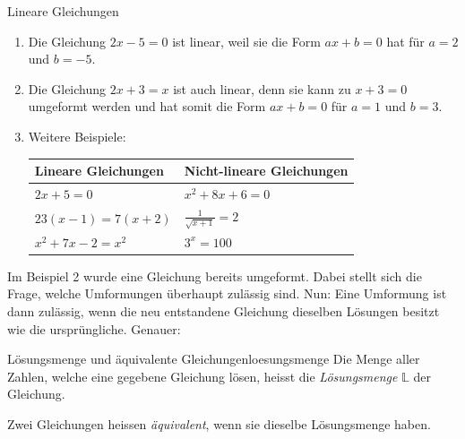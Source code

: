 \begin{bsp}{Lineare Gleichungen}{}
    \begin{enumerate}
        \item Die Gleichung \(2x-5=0\) ist linear, weil sie die Form \(ax+b=0\) hat für \(a=2\) und \(b=-5\).

        \item Die Gleichung \(2x+3=x\) ist auch linear, denn sie kann zu \(x+3=0\) umgeformt werden und hat somit die Form \(ax+b=0\) für \(a=1\) und \(b=3\).

        \item Weitere Beispiele:

              \begin{center}
                  \renewcommand{\arraystretch}{1.8}
                  \begin{tabular}{|>{\centering\arraybackslash}p{}|>{\centering\arraybackslash}p{}|}
                      \hline
                      \textbf{Lineare Gleichungen} & \textbf{Nicht-lineare Gleichungen}      \\
                      \hline
                      \(2x+5=0\)                   & \(x^2+8x+6=0\)                          \\
                      \hline
                      \(23(x-1)=7(x+2)\)           & \(\displaystyle\frac{1}{\sqrt{x+1}}=2\) \\
                      \hline
                      \(x^2+7x-2=x^2\)             & \(3^x=100\)                             \\
                      \hline
                  \end{tabular}
              \end{center}
    \end{enumerate}
\end{bsp}

Im Beispiel 2 wurde eine Gleichung bereits umgeformt. Dabei stellt sich die Frage, welche Umformungen überhaupt zulässig sind. Nun: Eine Umformung ist dann zulässig, wenn die neu entstandene Gleichung dieselben Lösungen besitzt wie die ursprüngliche. Genauer:

\begin{definition}{Lösungsmenge und äquivalente Gleichungen}{loesungsmenge}
    Die Menge aller Zahlen, welche eine gegebene Gleichung lösen, heisst die \textit{Lösungsmenge} \(\mathbb{L}\) der Gleichung.

    Zwei Gleichungen heissen \textit{äquivalent}, wenn sie dieselbe Lösungsmenge haben.
\end{definition}

